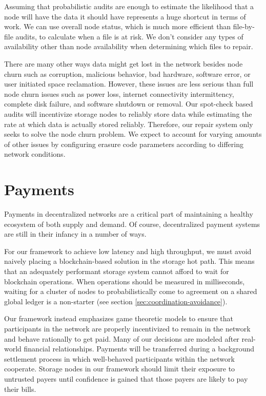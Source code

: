 \documentclass[11pt,fleqn,openany]{book}
\begin{document}
Assuming that probabilistic audits are enough to estimate the likelihood that
a  node will have the data it should have represents a huge shortcut in terms
of work. We can use overall node status,
which is much more efficient than file-by-file audits,
to calculate when a file is at risk.
We don't consider any types of availability other than node availability when
determining which files to repair.

There are many other ways data might get lost in the network besides node churn such as corruption, malicious behavior, bad hardware, software error, or
user initiated space
reclamation. However, these issues are less serious than full node
churn issues such as power loss, internet connectivity intermittency, complete disk failure,
and software shutdown or removal.
Our spot-check based audits will incentivize storage nodes to reliably store
data
while estimating the rate at which data is actually stored reliably.
Therefore, our repair system only seeks to solve the node churn problem.
We expect to account for varying
amounts of other issues by configuring erasure code
parameters according to differing network conditions.

\section{Payments}

Payments in decentralized networks are a critical part of maintaining a healthy
ecosystem of both supply and demand. Of course, decentralized payment systems
are still in their infancy in a number of ways.

For our framework to achieve low latency and high throughput, we must
avoid naively placing a blockchain-based solution in the storage hot path.
This means that an adequately performant storage system cannot afford to
wait for blockchain operations. When operations should be measured in
milliseconds, waiting for a cluster of nodes to probabilistically come to
agreement on a shared global ledger is a non-starter
(see section \ref{sec:coordination-avoidance}).

Our framework instead emphasizes game theoretic models to ensure
that participants in the network are properly incentivized to remain in the
network and behave rationally to get paid.
Many of our decisions are modeled after real-world financial relationships.
Payments will be transferred during
a background settlement process in which well-behaved participants within
the network cooperate. Storage nodes in our framework should limit their exposure
to untrusted payers until confidence is gained that those payers are likely
to pay their bills.
\end{document}
